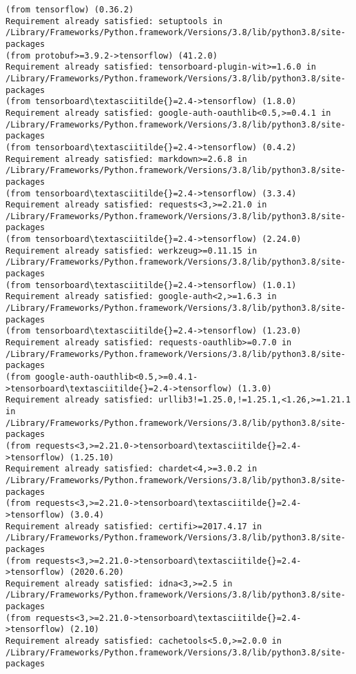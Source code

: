 \documentclass[11pt]{article}
\begin{document}
\begin{Verbatim}[commandchars=\\\{\}]
(from tensorflow) (0.36.2)
Requirement already satisfied: setuptools in
/Library/Frameworks/Python.framework/Versions/3.8/lib/python3.8/site-packages
(from protobuf>=3.9.2->tensorflow) (41.2.0)
Requirement already satisfied: tensorboard-plugin-wit>=1.6.0 in
/Library/Frameworks/Python.framework/Versions/3.8/lib/python3.8/site-packages
(from tensorboard\textasciitilde{}=2.4->tensorflow) (1.8.0)
Requirement already satisfied: google-auth-oauthlib<0.5,>=0.4.1 in
/Library/Frameworks/Python.framework/Versions/3.8/lib/python3.8/site-packages
(from tensorboard\textasciitilde{}=2.4->tensorflow) (0.4.2)
Requirement already satisfied: markdown>=2.6.8 in
/Library/Frameworks/Python.framework/Versions/3.8/lib/python3.8/site-packages
(from tensorboard\textasciitilde{}=2.4->tensorflow) (3.3.4)
Requirement already satisfied: requests<3,>=2.21.0 in
/Library/Frameworks/Python.framework/Versions/3.8/lib/python3.8/site-packages
(from tensorboard\textasciitilde{}=2.4->tensorflow) (2.24.0)
Requirement already satisfied: werkzeug>=0.11.15 in
/Library/Frameworks/Python.framework/Versions/3.8/lib/python3.8/site-packages
(from tensorboard\textasciitilde{}=2.4->tensorflow) (1.0.1)
Requirement already satisfied: google-auth<2,>=1.6.3 in
/Library/Frameworks/Python.framework/Versions/3.8/lib/python3.8/site-packages
(from tensorboard\textasciitilde{}=2.4->tensorflow) (1.23.0)
Requirement already satisfied: requests-oauthlib>=0.7.0 in
/Library/Frameworks/Python.framework/Versions/3.8/lib/python3.8/site-packages
(from google-auth-oauthlib<0.5,>=0.4.1->tensorboard\textasciitilde{}=2.4->tensorflow) (1.3.0)
Requirement already satisfied: urllib3!=1.25.0,!=1.25.1,<1.26,>=1.21.1 in
/Library/Frameworks/Python.framework/Versions/3.8/lib/python3.8/site-packages
(from requests<3,>=2.21.0->tensorboard\textasciitilde{}=2.4->tensorflow) (1.25.10)
Requirement already satisfied: chardet<4,>=3.0.2 in
/Library/Frameworks/Python.framework/Versions/3.8/lib/python3.8/site-packages
(from requests<3,>=2.21.0->tensorboard\textasciitilde{}=2.4->tensorflow) (3.0.4)
Requirement already satisfied: certifi>=2017.4.17 in
/Library/Frameworks/Python.framework/Versions/3.8/lib/python3.8/site-packages
(from requests<3,>=2.21.0->tensorboard\textasciitilde{}=2.4->tensorflow) (2020.6.20)
Requirement already satisfied: idna<3,>=2.5 in
/Library/Frameworks/Python.framework/Versions/3.8/lib/python3.8/site-packages
(from requests<3,>=2.21.0->tensorboard\textasciitilde{}=2.4->tensorflow) (2.10)
Requirement already satisfied: cachetools<5.0,>=2.0.0 in
/Library/Frameworks/Python.framework/Versions/3.8/lib/python3.8/site-packages

\end{Verbatim}
\end{document}
